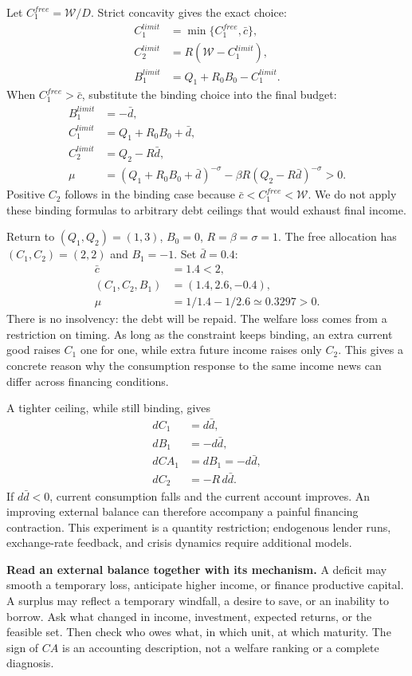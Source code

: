 Let $C_1^{free}=\mathcal W/D$. Strict concavity gives the exact choice:
\begin{align}
 C_1^{limit}&=\min\{C_1^{free},\bar c\},\\
 C_2^{limit}&=R(\mathcal W-C_1^{limit}),\\
 B_1^{limit}&=Q_1+R_0B_0-C_1^{limit}.
\end{align}
When $C_1^{free}>\bar c$, substitute the binding choice into the final budget:
\begin{align}
 B_1^{limit}&=-\bar d,\\
 C_1^{limit}&=Q_1+R_0B_0+\bar d,\\
 C_2^{limit}&=Q_2-R\bar d,\\
 \mu&=(Q_1+R_0B_0+\bar d)^{-\sigma}
       -\beta R(Q_2-R\bar d)^{-\sigma}>0.
\end{align}
Positive $C_2$ follows in the binding case because
$\bar c<C_1^{free}<\mathcal W$. We do not apply these binding formulas to
arbitrary debt ceilings that would exhaust final income.

Return to $(Q_1,Q_2)=(1,3)$, $B_0=0$, $R=\beta=\sigma=1$.
The free allocation has $(C_1,C_2)=(2,2)$ and $B_1=-1$. Set $\bar d=0.4$:
\begin{align}
 \bar c&=1.4<2,\\
 (C_1,C_2,B_1)&=(1.4,2.6,-0.4),\\
 \mu&=1/1.4-1/2.6\simeq0.3297>0.
\end{align}
There is no insolvency: the debt will be repaid. The welfare loss comes from
a restriction on timing. As long as the constraint keeps binding, an extra
current good raises $C_1$ one for one, while extra future income raises only
$C_2$. This gives a concrete reason why the consumption response to the same
income news can differ across financing conditions.

A tighter ceiling, while still binding, gives
\begin{align}
 dC_1&=d\bar d,\\
 dB_1&=-d\bar d,\\
 dCA_1&=dB_1=-d\bar d,\\
 dC_2&=-R\,d\bar d.
\end{align}
If $d\bar d<0$, current consumption falls and the current account improves.
An improving external balance can therefore accompany a painful financing
contraction. This experiment is a quantity restriction; endogenous lender
runs, exchange-rate feedback, and crisis dynamics require additional models.

\begin{greenblock}
\textbf{Read an external balance together with its mechanism.}
A deficit may smooth a temporary loss, anticipate higher income, or finance
productive capital. A surplus may reflect a temporary windfall, a desire to
save, or an inability to borrow. Ask what changed in income, investment,
expected returns, or the feasible set. Then check who owes what, in which
unit, at which maturity. The sign of $CA$ is an accounting description,
not a welfare ranking or a complete diagnosis.
\end{greenblock}

